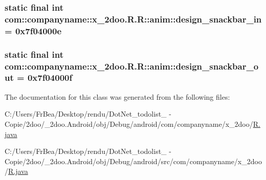 \hypertarget{classcom_1_1companyname_1_1x__2doo_1_1_r_1_1anim_5decf6c4d3971397323de37c00589704}{
\subsubsection[{design\_\-snackbar\_\-in}]{\setlength{\rightskip}{0pt plus 5cm}static final int com::companyname::x\_\-2doo.R.R::anim::design\_\-snackbar\_\-in = 0x7f04000e}}
\label{classcom_1_1companyname_1_1x__2doo_1_1_r_1_1anim_5decf6c4d3971397323de37c00589704}


\hypertarget{classcom_1_1companyname_1_1x__2doo_1_1_r_1_1anim_2474f5610d037f04f8921ed93a16359d}{
\subsubsection[{design\_\-snackbar\_\-out}]{\setlength{\rightskip}{0pt plus 5cm}static final int com::companyname::x\_\-2doo.R.R::anim::design\_\-snackbar\_\-out = 0x7f04000f}}
\label{classcom_1_1companyname_1_1x__2doo_1_1_r_1_1anim_2474f5610d037f04f8921ed93a16359d}




The documentation for this class was generated from the following files:\begin{CompactItemize}
\item 
C:/Users/FrBea/Desktop/rendu/DotNet\_\-todolist\_ - Copie/2doo/\_\-2doo.Android/obj/Debug/android/com/companyname/x\_\-2doo/\hyperlink{com_2companyname_2x__2doo_2_r_8java}{R.java}\item 
C:/Users/FrBea/Desktop/rendu/DotNet\_\-todolist\_ - Copie/2doo/\_\-2doo.Android/obj/Debug/android/src/com/companyname/x\_\-2doo/\hyperlink{src_2com_2companyname_2x__2doo_2_r_8java}{R.java}\end{CompactItemize}

